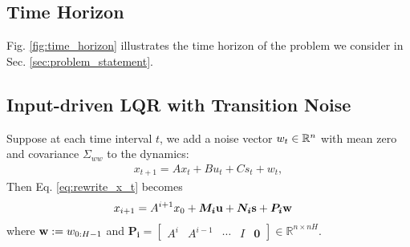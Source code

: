 


% 

\subsection{Time Horizon} 

Fig. \ref{fig:time_horizon} illustrates the time horizon of the problem we consider in Sec. \ref{sec:problem_statement}.

\subsection{Input-driven LQR with Transition Noise} \label{subsec:lqr_transition_noise}
Suppose at each time interval $t$, we add a noise vector $w_t \in \mathbb{R}^{n}$ with mean zero and covariance $\Sigma_{ww}$ to the dynamics:
\begin{align}
x_{t+1} = A x_t + B u_t + C s_t + w_t,
\end{align}
Then Eq. \ref{eq:rewrite_x_t} becomes
\begin{align}
    & x_{i+1} = A^{i+1} x_0 + \bm{M_{i}} \bold{u} + \bm{N_{i}} \bold{s} + \bm{P_i} \bold{w}
\end{align}
where $\bold{w} := w_{0:H-1}$ and $\bm{P_{i}} = \begin{bmatrix}
A^{i} & A^{i-1} & \cdots & I & \bm{0}
\end{bmatrix} \in \mathbb{R}^{n \times nH}$.


